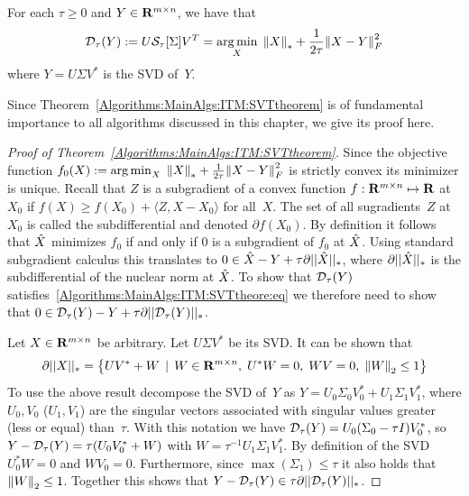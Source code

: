 \begin{theorem}
For each $\tau \geq 0$ and $Y\in {\mathbf R}^{m\times n}$, we have that
\begin{align}
{\mathcal{D}}_\tau(Y) := U {\mathcal{S}}_\tau[\Sigma] V^T = \operatorname*{arg\,min}_X \; {\left\|X\right\|}_{*}^{} + \frac{1}{2\tau} {\left\|X-Y\right\|}_{F}^{2}
\label{Algorithms:MainAlgs:ITM:SVTtheore:eq}
\end{align}
where $Y = U\Sigma V^*$ is the SVD of~$Y$.
\label{Algorithms:MainAlgs:ITM:SVTtheorem}
\end{theorem}

Since Theorem~\ref{Algorithms:MainAlgs:ITM:SVTtheorem} is of fundamental importance to all algorithms discussed in this chapter, we give its proof here.
%
\begin{proof}[Proof of Theorem~\ref{Algorithms:MainAlgs:ITM:SVTtheorem}] 
Since the objective function $f_0(X) := \operatorname*{arg\,min}_X \; {\left\|X\right\|}_{*}^{} + \frac{1}{2\tau} {\left\|X-Y\right\|}_{F}^{2}$ is strictly convex its minimizer is unique. Recall that $Z$ is a subgradient of a convex function $f:{\mathbf R}^{m\times n} \mapsto {\mathbf R}$ at $X_0$ if $f(X) \geq f(X_0) + \langle Z,X-X_0\rangle$ for all~$X$. The set of all sugradients~$Z$ at $X_0$ is called the subdifferential and denoted $\partial f(X_0)$. By definition it follows that ${\hat{X}}$ minimizes $f_0$ if and only if $0$ is a subgradient of $f_0$ at ${\hat{X}}$. Using standard subgradient calculus this translates to $0 \in {\hat{X}} - Y + \tau \partial ||{\hat{X}}||_{*}$, where $\partial ||{\hat{X}}||_{*}$ is the subdifferential of the nuclear norm at ${\hat{X}}$. To show that ${\mathcal{D}}_\tau(Y)$ satisfies~\eqref{Algorithms:MainAlgs:ITM:SVTtheore:eq} we therefore need to show that $0 \in {\mathcal{D}}_\tau(Y)  - Y + \tau \partial ||{\mathcal{D}}_\tau(Y) ||_{*}$.  

Let $X\in {\mathbf R}^{m\times n}$ be arbitrary. Let $U\Sigma V^*$ be its SVD. It can be shown that 
\begin{align*}
\partial ||X||_{*} = \left\{ UV^*+W \,\mid\, W\in {\mathbf R}^{m\times n},\; U^*W =0,\; WV =0,\; {\left\|W\right\|}_{2}^{}\leq 1 \right\}
\end{align*}
To use the above result decompose the SVD of~$Y$ as $Y = U_0\Sigma_0V_0^* + U_1\Sigma_1V_1^*$, where $U_0,V_0$ ($U_1,V_1$) are the singular vectors associated with singular values greater (less or equal) than~$\tau$. With this notation we have ${\mathcal{D}}_\tau(Y) = U_0(\Sigma_0-\tau I)V_0^*$,  so $Y-{\mathcal{D}}_\tau(Y) = \tau (U_0V_0^*+W)$ with $W=\tau^{-1}U_1\Sigma_1V_1^*$. By definition of the SVD $U_0^*W=0$ and $WV_0=0$. Furthermore, since $\max(\Sigma_1) \leq \tau$ it also holds that ${\left\|W\right\|}_{2}^{}\leq 1$. Together this shows that $Y - {\mathcal{D}}_\tau(Y) \in \tau \partial ||{\mathcal{D}}_\tau(Y) ||_{*}$.
\end{proof}


